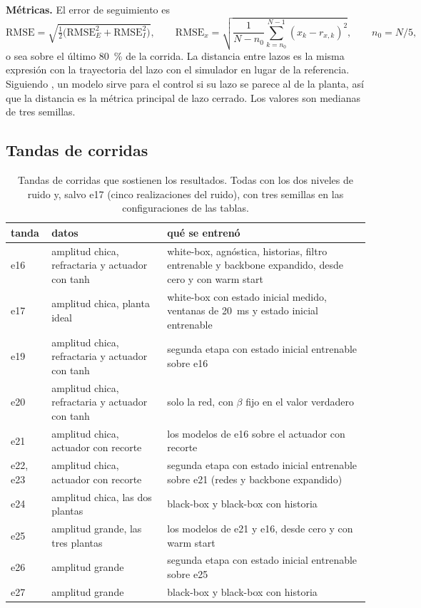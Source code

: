 \documentclass[11pt,a4paper]{article}
\begin{document}
\textbf{Métricas.} El error de seguimiento es
\begin{equation}
\mathrm{RMSE} = \sqrt{\tfrac{1}{2}\big(\mathrm{RMSE}_E^2 + \mathrm{RMSE}_I^2\big)},\qquad
\mathrm{RMSE}_x = \sqrt{\frac{1}{N - n_0}\sum_{k=n_0}^{N-1}(x_k - r_{x,k})^2},\qquad n_0 = N/5,
\end{equation}
o sea sobre el último 80~\% de la corrida. La distancia entre lazos es la misma expresión con la trayectoria del lazo con el simulador en lugar de la referencia. Siguiendo \cite{gevers2005}, un modelo sirve para el control si su lazo se parece al de la planta, así que la distancia es la métrica principal de lazo cerrado. Los valores son medianas de tres semillas.

\subsection{Tandas de corridas}

\begin{table}[H]
\centering
\small
\caption{Tandas de corridas que sostienen los resultados. Todas con los dos niveles de ruido y, salvo e17 (cinco realizaciones del ruido), con tres semillas en las configuraciones de las tablas.}
\label{tab:tandas}
\begin{tabular}{@{}l>{\raggedright}p{}>{\raggedright\arraybackslash}p{}@{}}
\toprule
tanda & datos & qué se entrenó \\
\midrule
e16 & amplitud chica, refractaria y actuador con tanh & white-box, agnóstica, historias, filtro entrenable y backbone expandido, desde cero y con warm start \\
e17 & amplitud chica, planta ideal & white-box con estado inicial medido, ventanas de 20~ms y estado inicial entrenable \\
e19 & amplitud chica, refractaria y actuador con tanh & segunda etapa con estado inicial entrenable sobre e16 \\
e20 & amplitud chica, refractaria y actuador con tanh & solo la red, con $\beta$ fijo en el valor verdadero \\
e21 & amplitud chica, actuador con recorte & los modelos de e16 sobre el actuador con recorte \\
e22, e23 & amplitud chica, actuador con recorte & segunda etapa con estado inicial entrenable sobre e21 (redes y backbone expandido) \\
e24 & amplitud chica, las dos plantas & black-box y black-box con historia \\
e25 & amplitud grande, las tres plantas & los modelos de e21 y e16, desde cero y con warm start \\
e26 & amplitud grande & segunda etapa con estado inicial entrenable sobre e25 \\
e27 & amplitud grande & black-box y black-box con historia \\
\bottomrule
\end{tabular}
\end{table}
\end{document}
